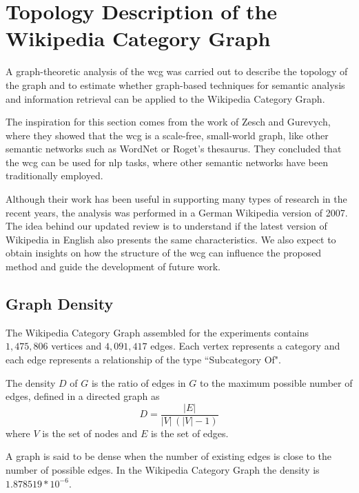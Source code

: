 
\section{\hspace*{3pt}  Topology Description of the Wikipedia Category Graph}

A graph-theoretic analysis of the \gls{wcg} was carried out to describe the topology of the graph and to estimate whether graph-based techniques for semantic analysis and information retrieval can be applied to the Wikipedia Category Graph.

The inspiration for this section comes from the work of Zesch and Gurevych\cite{zesch2007analysis}, where they showed that the \gls{wcg} is a scale-free, small-world graph, like other semantic networks such as WordNet or Roget’s thesaurus. They concluded that the \gls{wcg} can be used for \gls{nlp} tasks, where other semantic networks have been traditionally employed\cite{zesch2007analysis}.

Although their work has been useful in supporting many types of research in the recent years, the analysis was performed in a German Wikipedia version of 2007. The idea behind our updated review is to understand if the latest version of Wikipedia in English also presents the same characteristics. We also expect to obtain insights on how the structure of the \gls{wcg} can influence the proposed method and guide the development of future work.



\subsection{\hspace*{3pt} Graph Density}

The Wikipedia Category Graph assembled for the experiments contains $1,475,806$ vertices and $4,091,417$ edges. Each vertex represents a category and each edge represents a relationship of the type ``Subcategory Of". 


The density $D$ of $G$ is the ratio of edges in $G$ to the maximum possible number of edges, defined in a directed graph as  
\begin{equation}
D={\frac  {|E|}{|V|\,(|V|-1)}}
\end{equation} where $V$ is the set of nodes and $E$ is the set of edges.

A graph is said to be dense when the number of existing edges is close to the number of possible edges. In the Wikipedia Category Graph the density is $1.878519 * 10^{-6}$.


